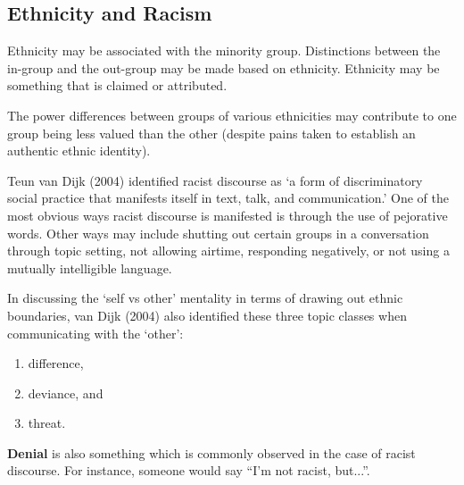 \documentclass[../main.tex]{subfiles}
\begin{document}
    \subsection{Ethnicity and Racism}
    Ethnicity may be associated with the minority group. Distinctions between the in-group and the out-group may be made based on ethnicity. Ethnicity may be something that is claimed or attributed. \par
    The power differences between groups of various ethnicities may contribute to one group being less valued than the other (despite pains taken to establish an authentic ethnic identity). \par
    Teun van Dijk (2004) identified racist discourse as `a form of discriminatory social practice that manifests itself in text, talk, and communication.' One of the most obvious ways racist discourse is manifested is through the use of pejorative words. Other ways may include shutting out certain groups in a conversation through topic setting, not allowing airtime, responding negatively, or not using a mutually intelligible language. \par
    In discussing the `self vs other' mentality in terms of drawing out ethnic boundaries, van Dijk (2004) also identified these three topic classes when communicating with the `other': \begin{enumerate}
        \item difference,
        \item deviance, and
        \item threat.
    \end{enumerate}
    
    \textbf{Denial} is also something which is commonly observed in the case of racist discourse. For instance, someone would say ``I'm not racist, but...''. 
\end{document}
